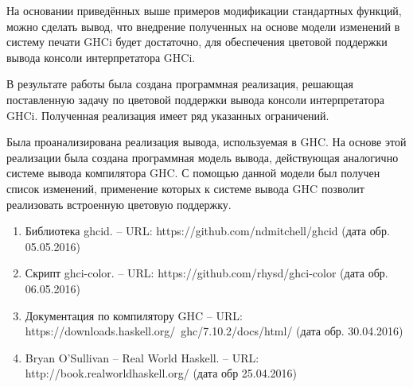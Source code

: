 На основании приведённых выше примеров модификации стандартных функций, можно сделать вывод, что внедрение полученных на основе модели изменений в систему печати GHCi будет достаточно, для обеспечения цветовой поддержки вывода консоли интерпретатора GHCi.


\Conc
В результате работы была создана программная реализация, решающая поставленную задачу по цветовой поддержки вывода консоли интерпретатора GHCi. Полученная реализация имеет ряд указанных ограничений.

Была проанализирована реализация вывода, используемая в GHC. На основе этой реализации была создана программная модель вывода, действующая аналогично системе вывода компилятора GHC. С помощью данной модели был получен список изменений, применение которых к  системе вывода GHC позволит реализовать встроенную цветовую поддержку.

\begin{enumerate}
  \item Библиотека ghcid. -- URL: https://github.com/ndmitchell/ghcid (дата обр. 05.05.2016)
  \item Скрипт ghci-color. -- URL: https://github.com/rhysd/ghci-color (дата обр. 06.05.2016)
  \item Документация по компилятору GHC -- URL: https://downloads.haskell.org/~ghc/7.10.2/docs/html/ (дата обр. 30.04.2016)
  \item Bryan O'Sullivan -- Real World Haskell. -- URL: http://book.realworldhaskell.org/ (дата обр 25.04.2016)
\end{enumerate}

